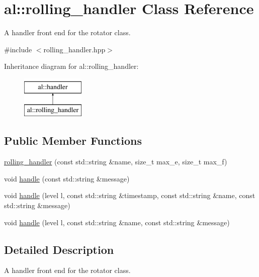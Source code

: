\hypertarget{classal_1_1rolling__handler}{\section{al\-:\-:rolling\-\_\-handler \-Class \-Reference}
\label{classal_1_1rolling__handler}
}


\-A handler front end for the rotator class.  




{\ttfamily \#include $<$rolling\-\_\-handler.\-hpp$>$}

\-Inheritance diagram for al\-:\-:rolling\-\_\-handler\-:\begin{figure}[H]
\begin{center}
\leavevmode
\includegraphics[height=2.000000cm]{classal_1_1rolling__handler}
\end{center}
\end{figure}
\subsection*{\-Public \-Member \-Functions}
\begin{DoxyCompactItemize}
\item 
\hyperlink{classal_1_1rolling__handler_a3794e5b1bca80be34af48a037c6ecf20}{rolling\-\_\-handler} (const std\-::string \&name, size\-\_\-t max\-\_\-e, size\-\_\-t max\-\_\-f)
\item 
void \hyperlink{classal_1_1rolling__handler_a70bcaa16809070c914baa628a51650fb}{handle} (const std\-::string \&message)
\item 
void \hyperlink{classal_1_1rolling__handler_a7be82c1cfe439d591d50dc83eeea35c8}{handle} (level l, const std\-::string \&timestamp, const std\-::string \&name, const std\-::string \&message)
\item 
void \hyperlink{classal_1_1rolling__handler_aaaeaff11945ff3c2a313f465724ad8a7}{handle} (level l, const std\-::string \&name, const std\-::string \&message)
\end{DoxyCompactItemize}


\subsection{\-Detailed \-Description}
\-A handler front end for the rotator class. 

